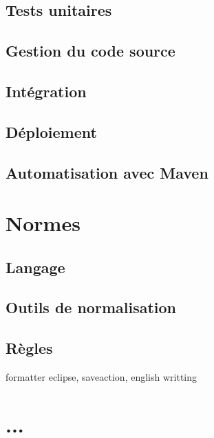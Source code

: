 \documentclass[11pt]{article}
\begin{document}
\subsection{Tests unitaires}

\subsection{Gestion du code source}

\subsection{Intégration}

\subsection{Déploiement}

\subsection{Automatisation avec Maven}

\section{Normes}

\subsection{Langage}

\subsection{Outils de normalisation}

\subsection{Règles}

formatter eclipse, saveaction, english writting

\section{...}
\end{document}
